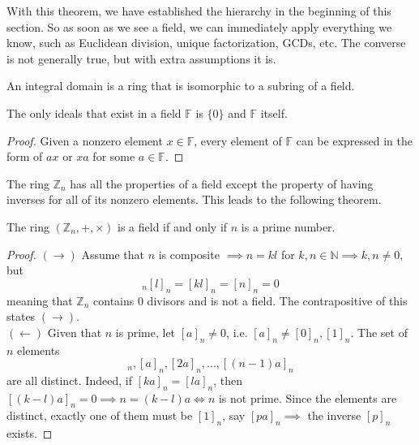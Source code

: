   With this theorem, we have established the hierarchy in the beginning of this section. So as soon as we see a field, we can immediately apply everything we know, such as Euclidean division, unique factorization, GCDs, etc. The converse is not generally true, but with extra assumptions it is. 

  \begin{theorem}
    An integral domain is a ring that is isomorphic to a subring of a field. 
  \end{theorem}

  \begin{theorem}
    The only ideals that exist in a field $\mathbb{F}$ is $\{0\}$ and $\mathbb{F}$ itself. 
  \end{theorem}
  \begin{proof}
    Given a nonzero element $x \in \mathbb{F}$, every element of $\mathbb{F}$ can be expressed in the form of $a x$ or $x a$ for some $a \in \mathbb{F}$. 
  \end{proof}

  The ring $\mathbb{Z}_n$ has all the properties of a field except the property of having inverses for all of its nonzero elements. This leads to the following theorem. 

  \begin{theorem}
    The ring $(\mathbb{Z}_{n}, +, \times)$ is a field if and only if $n$ is a prime number. 
  \end{theorem}
  \begin{proof}
    $(\rightarrow)$ Assume that $n$ is composite $\implies n = k l$ for $k, n \in \mathbb{N} \implies k, n \neq 0$, but 
    \begin{equation}
      [k]_n [l]_n = [k l]_n = [n]_n = 0
    \end{equation}
    meaning that $\mathbb{Z}_n$ contains $0$ divisors and is not a field. The contrapositive of this states $(\rightarrow)$. \\
    $(\leftarrow)$ Given that $n$ is prime, let $[a]_n \neq 0$, i.e. $[a]_n \neq [0]_n, [1]_n$. The set of $n$ elements 
    \begin{equation}
      [0]_n, [a]_n, [2a]_n, ..., [(n-1)a]_n
    \end{equation}
    are all distinct. Indeed, if $[k a]_n = [l a]_n$, then $[(k-l) a]_n = 0 \implies n = (k-l) a \iff n$ is not prime. Since the elements are distinct, exactly one of them must be $[1]_n$, say $[p a]_n \implies$ the inverse $[p]_n$ exists. 
  \end{proof}

